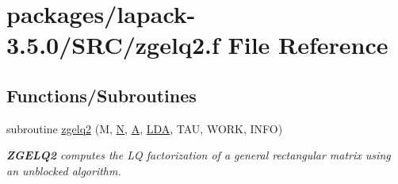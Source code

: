 \hypertarget{zgelq2_8f}{}\section{packages/lapack-\/3.5.0/\+S\+R\+C/zgelq2.f File Reference}
\label{zgelq2_8f}
\subsection*{Functions/\+Subroutines}
\begin{DoxyCompactItemize}
\item 
subroutine \hyperlink{group__complex16GEcomputational_ga3ef30af067557006a607c01cc2310955}{zgelq2} (M, \hyperlink{polmisc_8c_a0240ac851181b84ac374872dc5434ee4}{N}, \hyperlink{classA}{A}, \hyperlink{example__user_8c_ae946da542ce0db94dced19b2ecefd1aa}{L\+D\+A}, T\+A\+U, W\+O\+R\+K, I\+N\+F\+O)
\begin{DoxyCompactList}\small\item\em {\bfseries Z\+G\+E\+L\+Q2} computes the L\+Q factorization of a general rectangular matrix using an unblocked algorithm. \end{DoxyCompactList}\end{DoxyCompactItemize}
